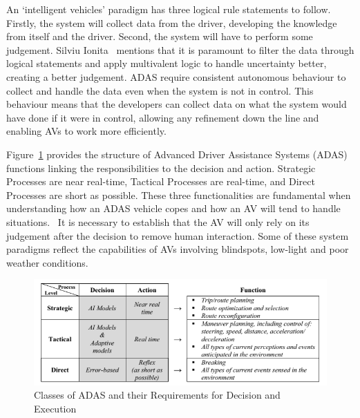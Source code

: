 \documentclass[12pt]{report} %
\begin{document}
		An `intelligent vehicles' paradigm has three logical rule statements to follow. Firstly, the system will collect data from the driver, developing the knowledge from itself and the driver. Second, the system will have to perform some judgement. Silviu Ionita~\cite{ionita_autonomous_2017} mentions that it is paramount to filter the data through logical statements and apply multivalent logic to handle uncertainty better, creating a better judgement. ADAS require consistent autonomous behaviour to collect and handle the data even when the system is not in control. This behaviour means that the developers can collect data on what the system would have done if it were in control, allowing any refinement down the line and enabling AVs to work more efficiently.

		Figure~\ref{fig:adasFunctionsIonita} provides the structure of Advanced Driver Assistance Systems (ADAS) functions linking the responsibilities to the decision and action. Strategic Processes are near real-time, Tactical Processes are real-time, and Direct Processes are short as possible. These three functionalities are fundamental when understanding how an ADAS vehicle copes and how an AV will tend to handle situations.~\cite{ionita_autonomous_2017} It is necessary to establish that the AV will only rely on its judgement after the decision to remove human interaction. Some of these system paradigms reflect the capabilities of AVs involving blindspots, low-light and poor weather conditions.
		\begin{figure}[h]
			\centering
			\includegraphics[width=\columnwidth]{Figures/literature_review/proposal/SystemFunctionality-3.png}
			\caption{Classes of ADAS and their Requirements for Decision and Execution~\cite{ionita_autonomous_2017}}
			\label{fig:adasFunctionsIonita}
		\end{figure}
\end{document}
